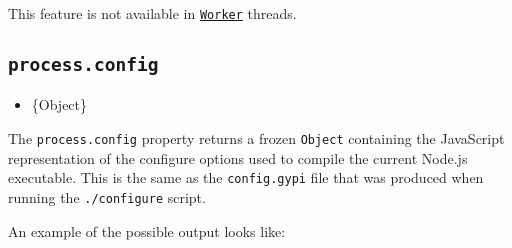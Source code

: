 \begin{Shaded}
\begin{Highlighting}[]
\OperatorTok{,}\OperatorTok{=} \NormalTok{(}\NormalTok{)}\OperatorTok{;}

\NormalTok{(}\SpecialCharTok{$\{}\NormalTok{()}\SpecialCharTok{\}}\VerbatimStringTok{\textasciigrave{}}\NormalTok{)}\OperatorTok{;}
\NormalTok{ \{}
  \NormalTok{(}\NormalTok{)}\OperatorTok{;}
  \NormalTok{(}\SpecialCharTok{$\{}\NormalTok{()}\SpecialCharTok{\}}\VerbatimStringTok{\textasciigrave{}}\NormalTok{)}\OperatorTok{;}
\NormalTok{\} }
  \NormalTok{(}\SpecialCharTok{$\{}\SpecialCharTok{\}}\VerbatimStringTok{\textasciigrave{}}\NormalTok{)}\OperatorTok{;}
\NormalTok{\}}
\end{Highlighting}
\end{Shaded}

This feature is not available in
\href{worker_threads.md\#class-worker}{\texttt{Worker}} threads.

\subsection{\texorpdfstring{\texttt{process.config}}{process.config}}\label{process.config}

\begin{itemize}
\tightlist
\item
  \{Object\}
\end{itemize}

The \texttt{process.config} property returns a frozen \texttt{Object}
containing the JavaScript representation of the configure options used
to compile the current Node.js executable. This is the same as the
\texttt{config.gypi} file that was produced when running the
\texttt{./configure} script.

An example of the possible output looks like:

